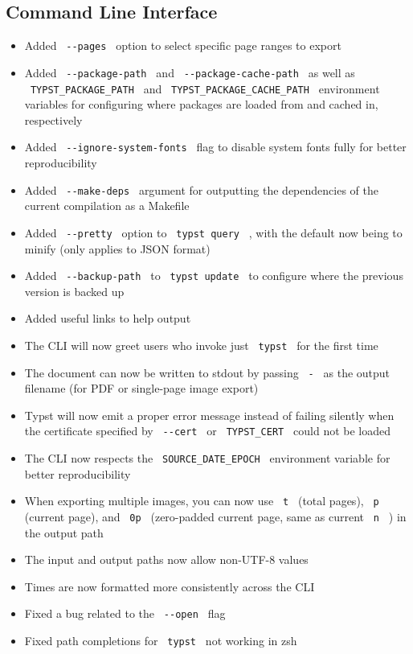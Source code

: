\subsection{Command Line Interface}\label{command-line-interface}

\begin{itemize}
\tightlist
\item
  Added \texttt{\ -\/-pages\ } option to select specific page ranges to
  export
\item
  Added \texttt{\ -\/-package-path\ } and
  \texttt{\ -\/-package-cache-path\ } as well as
  \texttt{\ TYPST\_PACKAGE\_PATH\ } and
  \texttt{\ TYPST\_PACKAGE\_CACHE\_PATH\ } environment variables for
  configuring where packages are loaded from and cached in, respectively
\item
  Added \texttt{\ -\/-ignore-system-fonts\ } flag to disable system
  fonts fully for better reproducibility
\item
  Added \texttt{\ -\/-make-deps\ } argument for outputting the
  dependencies of the current compilation as a Makefile
\item
  Added \texttt{\ -\/-pretty\ } option to \texttt{\ typst\ query\ } ,
  with the default now being to minify (only applies to JSON format)
\item
  Added \texttt{\ -\/-backup-path\ } to \texttt{\ typst\ update\ } to
  configure where the previous version is backed up
\item
  Added useful links to help output
\item
  The CLI will now greet users who invoke just \texttt{\ typst\ } for
  the first time
\item
  The document can now be written to stdout by passing \texttt{\ -\ } as
  the output filename (for PDF or single-page image export)
\item
  Typst will now emit a proper error message instead of failing silently
  when the certificate specified by \texttt{\ -\/-cert\ } or
  \texttt{\ TYPST\_CERT\ } could not be loaded
\item
  The CLI now respects the \texttt{\ SOURCE\_DATE\_EPOCH\ } environment
  variable for better reproducibility
\item
  When exporting multiple images, you can now use \texttt{\ t\ } (total
  pages), \texttt{\ p\ } (current page), and \texttt{\ 0p\ }
  (zero-padded current page, same as current \texttt{\ n\ } ) in the
  output path
\item
  The input and output paths now allow non-UTF-8 values
\item
  Times are now formatted more consistently across the CLI
\item
  Fixed a bug related to the \texttt{\ -\/-open\ } flag
\item
  Fixed path completions for \texttt{\ typst\ } not working in zsh
\end{itemize}

